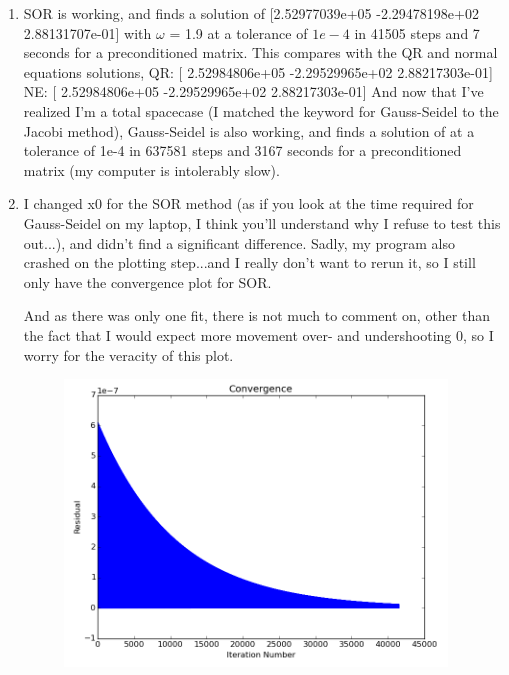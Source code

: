 \documentclass[10pt, preprint]{aastex}
\begin{document}
\begin{enumerate}
\item SOR is working, and finds a solution of [2.52977039e+05  -2.29478198e+02   2.88131707e-01]
with $\omega$ = 1.9 at a tolerance of $1e-4$ in 41505 steps and 7 seconds for a preconditioned matrix. This compares with the QR and normal equations solutions,
 QR: [  2.52984806e+05  -2.29529965e+02   2.88217303e-01]
 NE: [  2.52984806e+05  -2.29529965e+02   2.88217303e-01]
And now that I've realized I'm a total spacecase (I matched the keyword for Gauss-Seidel to the Jacobi method), Gauss-Seidel is also working, and finds a solution of at a tolerance of 1e-4 in 637581 steps and 3167 seconds for a preconditioned matrix (my computer is intolerably slow).

\item I changed x0 for the SOR method (as if you look at the time required for Gauss-Seidel on my laptop, I think you'll understand why I refuse to test this out...), and didn't find a significant difference. Sadly, my program also crashed on the plotting step...and I really don't want to rerun it, so I still only have the convergence plot for SOR.

And as there was only one fit, there is not much to comment on, other than the fact that I would expect more movement over- and undershooting 0, so I worry for the veracity of this plot.
\begin{figure}[!ht]
  \includegraphics[width=4in]{hw5_fig3.png}
\end{figure}

\end{enumerate}
\end{document}
